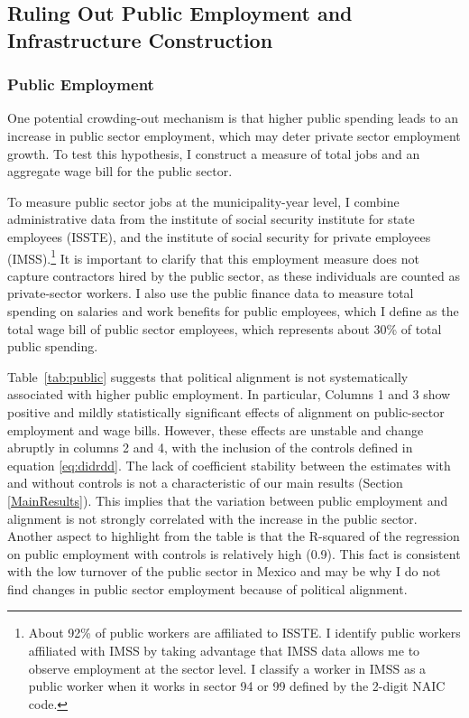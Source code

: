 \documentclass[dv_diss_main.tex]{subfiles}
\begin{document}
\subsection{Ruling Out Public Employment and Infrastructure Construction}

\subsubsection{Public Employment}  One potential crowding-out mechanism is that higher public spending leads to an increase in public sector employment, which may deter private sector employment growth. To test this hypothesis, I construct a measure of total jobs and an aggregate wage bill for the public sector.

To measure public sector jobs at the municipality-year level, I combine administrative data from the institute of social security institute for state employees (ISSTE), and the institute of social security for private employees (IMSS).\footnote{ About 92\% of public workers are affiliated to ISSTE. I identify public workers affiliated with IMSS by taking advantage that IMSS data allows me to observe employment at the sector level. I classify a worker in IMSS as a public worker when it works in sector 94 or 99 defined by the 2-digit NAIC code.} It is important to clarify that this employment measure does not capture contractors hired by the public sector, as these individuals are counted as private-sector workers. I also use the public finance data to measure total spending on salaries and work benefits for public employees, which I define as the total wage bill of public sector employees, which represents about 30\% of total public spending. 

Table~\ref{tab:public} suggests that political alignment is not systematically associated with higher public employment. In particular, Columns 1 and 3 show positive and mildly statistically significant effects of alignment on public-sector employment and wage bills. However, these effects are unstable and change abruptly in columns 2 and 4, with the inclusion of the controls defined in equation \eqref{eq:didrdd}. The lack of coefficient stability between the estimates with and without controls is not a characteristic of our main results (Section \ref{MainResults}). This implies that the variation between public employment and alignment is not strongly correlated with the increase in the public sector.  Another aspect to highlight from the table is that the R-squared of the regression on public employment with controls is relatively high (0.9). This fact is consistent with the low turnover of the public sector in Mexico and may be why I do not find changes in public sector employment because of political alignment.
\end{document}
